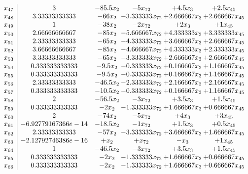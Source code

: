 \documentclass[11pt]{article}
\begin{document}
\[\begin{array}{c| c c@{\hskip 2pt} c@{\hskip 2pt} c@{\hskip 2pt} c@{\hskip 2pt} }
 x_{47}   &  3 & -85.5 x_{2} & -5 x_{72} & + 4.5 x_{3} & + 2.5 x_{45}\\
 x_{48}   &  3.33333333333 & -66 x_{2} & -3.333333 x_{72} & + 2.666667 x_{3} & + 2.666667 x_{45}\\
 x_{49}   &  1 & -38 x_{2} & -2 x_{72} & + 2 x_{3} & + 1 x_{45}\\
 x_{50}   &  2.66666666667 & -85 x_{2} & -5.666667 x_{72} & + 4.333333 x_{3} & + 3.333333 x_{45}\\
 x_{51}   &  2.33333333333 & -65 x_{2} & -4.333333 x_{72} & + 3.666667 x_{3} & + 2.666667 x_{45}\\
 x_{52}   &  3.66666666667 & -85 x_{2} & -4.666667 x_{72} & + 4.333333 x_{3} & + 2.333333 x_{45}\\
 x_{53}   &  3.33333333333 & -65 x_{2} & -3.333333 x_{72} & + 2.666667 x_{3} & + 2.666667 x_{45}\\
 x_{54}   &  0.333333333333 & -9.5 x_{2} & -0.333333 x_{72} & + 0.166667 x_{3} & + 1.166667 x_{45}\\
 x_{55}   &  0.333333333333 & -9.5 x_{2} & -0.333333 x_{72} & + 0.166667 x_{3} & + 1.166667 x_{45}\\
 x_{56}   &  2.33333333333 & -46.5 x_{2} & -2.333333 x_{72} & + 2.166667 x_{3} & + 2.166667 x_{45}\\
 x_{57}   &  0.333333333333 & -10.5 x_{2} & -0.333333 x_{72} & + 0.166667 x_{3} & + 1.166667 x_{45}\\
 x_{58}   &  2 & -56.5 x_{2} & -3 x_{72} & + 3.5 x_{3} & + 1.5 x_{45}\\
 x_{59}   &  0.333333333333 & -2 x_{2} & -1.333333 x_{72} & + 1.666667 x_{3} & + 0.666667 x_{45}\\
 x_{60}   &  2 & -74 x_{2} & -5 x_{72} & + 4 x_{3} & + 3 x_{45}\\
 x_{61}   &  -6.92779167366e-14 & -18.5 x_{2} & -1 x_{72} & + 1.5 x_{3} & + 0.5 x_{45}\\
 x_{62}   &  2.33333333333 & -57 x_{2} & -3.333333 x_{72} & + 3.666667 x_{3} & + 1.666667 x_{45}\\
 x_{63}   &  -2.12792746386e-16 & +  x_{2} & +  x_{72} & - x_{3} & + 1 x_{45}\\
 x_{64}   &  1 & -46.5 x_{2} & -3 x_{72} & + 3.5 x_{3} & + 1.5 x_{45}\\
 x_{65}   &  0.333333333333 & -2 x_{2} & -1.333333 x_{72} & + 1.666667 x_{3} & + 0.666667 x_{45}\\
 x_{66}   &  0.333333333333 & -2 x_{2} & -1.333333 x_{72} & + 1.666667 x_{3} & + 0.666667 x_{45}\\

\end{array}\]
\end{document}

